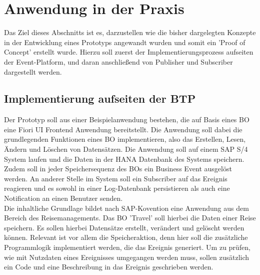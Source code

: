 \section{Anwendung in der Praxis}

\label{implementierung}
  Das Ziel dieses Abschnitts ist es, darzustellen wie die bisher dargelegten Konzepte in der Entwicklung eines Prototyps angewandt wurden und somit ein 'Proof of Concept' erstellt wurde. Hierzu soll zuerst der Implementierungsprozess aufseiten der Event-Platform, und daran anschließend von Publisher und Subscriber dargestellt werden.\\

  \subsection{Implementierung aufseiten der BTP}
  
  Der Prototyp soll aus einer Beispielanwendung bestehen, die auf Basis eines \ac{BO} eine Fiori UI Frontend Anwendung bereitstellt. Die Anwendung soll dabei die grundlegenden Funktionen eines \ac{BO} implementieren, also das Erstellen, Lesen, Ändern und Löschen von Datensätzen. Die Anwendung soll auf einem SAP S/4 System laufen und die Daten in der HANA Datenbank des Systems speichern. Zudem soll in jeder Speichersequenz des \ac{BO}s ein Business Event ausgelöst werden. An anderer Stelle im System soll ein Subscriber auf das Ereignis reagieren und es sowohl in einer Log-Datenbank persistieren als auch eine Notification an einen Benutzer senden. \\
  Die inhaltliche Grundlage bildet nach SAP-Kovention eine Anwendung aus dem Bereich des Reisemanagements. Das \ac{BO} 'Travel' soll hierbei die Daten einer Reise speichern. Es sollen hierbei Datensätze erstellt, verändert und gelöscht werden können. Relevant ist vor allem die Speicheraktion, denn hier soll die zusätzliche Programmlogik implementiert werden, die das Ereignis generiert. Um zu prüfen, wie mit Nutzdaten eines Ereignisses umgegangen werden muss, sollen zusätzlich ein Code und eine Beschreibung in das Ereignis geschrieben werden.\\
  

